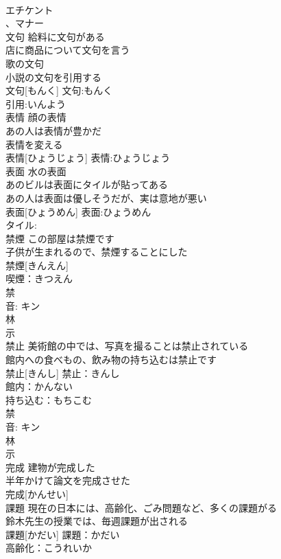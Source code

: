 \documentclass[8pt]{extreport}
\begin{document}
\begin{CJK}{UTF8}{min}
\\	エチケント 
\\	、マナー 
\\	文句	給料に文句がある 
\\	店に商品について文句を言う 
\\	歌の文句 
\\	小説の文句を引用する 
\\	文句[もんく]			文句:もんく
\\	引用:いんよう
\\	表情	顔の表情 
\\	あの人は表情が豊かだ 
\\	表情を変える 
\\	表情[ひょうじょう]			表情:ひょうじょう
\\	表面	水の表面 
\\	あのビルは表面にタイルが貼ってある 
\\	あの人は表面は優しそうだが、実は意地が悪い 
\\	表面[ひょうめん]			表面:ひょうめん
\\	タイル:
\\	禁煙	この部屋は禁煙です 
\\	子供が生まれるので、禁煙することにした 
\\	禁煙[きんえん]			
\\	喫煙：きつえん
\\	禁 
\\	音: キン 
\\	林 
\\	示 
\\	禁止	美術館の中では、写真を撮ることは禁止されている 
\\	館内への食べもの、飲み物の持ち込むは禁止です 
\\	禁止[きんし]			禁止：きんし
\\	館内：かんない
\\	持ち込む：もちこむ
\\	禁 
\\	音: キン 
\\	林 
\\	示 
\\	完成	建物が完成した 
\\	半年かけて論文を完成させた 
\\	完成[かんせい]						
\\	課題	現在の日本には、高齢化、ごみ問題など、多くの課題がる 
\\	鈴木先生の授業では、毎週課題が出される 
\\	課題[かだい]			課題：かだい
\\	高齢化：こうれいか

\end{CJK}
\end{document}
